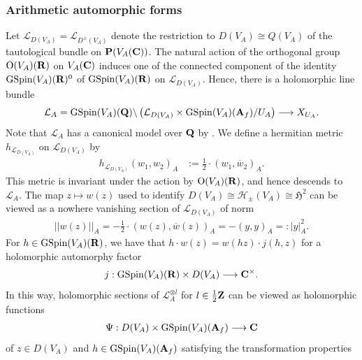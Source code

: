 \documentclass{amsart}
\theoremstyle{definition}
\begin{document}
\subsubsection{Arithmetic automorphic forms}

Let $\mathcal{L}_{D(V_A)} = \mathcal{L}_{D^{\pm}(V_A)}$ denote the restriction to $D (V_A) \cong Q(V_A)$ of the tautological bundle on ${\bf{P}}(V_A({\bf{C}}))$. 
The natural action of the orthogonal group $\operatorname{O}(V_A)({\bf{R}})$ on $V_A({\bf{C}})$ induces one of the connected 
component of the identity $\operatorname{GSpin}(V_A)({\bf{R}})^{0}$ of $\operatorname{GSpin}(V_A)({\bf{R}})$
on $\mathcal{L}_{D(V_A)}$. Hence, there is a holomorphic line bundle 
\begin{align*} \mathcal{L}_A= \operatorname{GSpin}(V_A)({\bf{Q}}) 
\backslash \left( \mathcal{L}_{D(V_A)} \times \operatorname{GSpin}(V_A)({\bf{A}}_f) / U_A \right)\longrightarrow X_{U_A}. \end{align*}
Note that $\mathcal{L}_A$ has a canonical model over ${\bf{Q}}$ by \cite{Ha}.  
We define a hermitian metric $h_{ \mathcal{L}_{D(V_A)} }$ on $\mathcal{L}_{D(V_A)}$ by 
\begin{align*} h_{ \mathcal{L}_{ D(V_A) }}(w_1, w_2)_A &:= \frac{1}{2} \cdot (w_1, \overline{w}_2)_A. \end{align*}
This metric is invariant under the action by $\operatorname{O}(V_A)({\bf{R}})$, and hence descends to $\mathcal{L}_A$. 
The map $z \mapsto w(z)$ used to identify $D(V_A) \cong \mathcal{H}_{\pm}(V_A) \cong \mathfrak{H}^2$
can be viewed as a nowhere vanishing section of $\mathcal{L}_{D(V_A)}$ of norm 
\begin{align*} \vert \vert w( z) \vert \vert_A = - \frac{1}{2} \cdot (w(z), \overline{w}(z))_A = - (y, y)_A =: \vert y \vert^2_A. \end{align*}
For $h \in \operatorname{GSpin}(V_A)({\bf{R}})$, we have that $h \cdot w(z) = w(hz) \cdot j(h, z)$ for a holomorphic automorphy factor 
\begin{align*} j: \operatorname{GSpin}(V_A)({\bf{R}}) \times D(V_A) \longrightarrow {\bf{C}}^{\times}. \end{align*} 
In this way, holomorphic sections of $\mathcal{L}_A^{\otimes l}$ for $l \in \frac{1}{2}{\bf{Z}}$ can be viewed as holomorphic functions 
\begin{align*} \Psi: D(V_A) \times \operatorname{GSpin}(V_A)({\bf{A}}_f) \longrightarrow {\bf{C}} \end{align*} 
of $z \in D(V_A)$ and $h \in \operatorname{GSpin}(V_A)({\bf{A}}_f)$ satisfying the transformation properties
\end{document}
